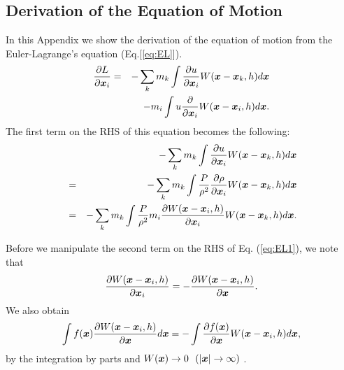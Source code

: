 \documentclass{cjour}
\newcommand{ \Vec   }[1]{ \mbox{\boldmath $ #1 $} }
\newcommand{ \PD    }[2]{ \frac{ \partial #1 }{ \partial #2 } }
\begin{document}
\begin{article}
\appendix{}

\section{Derivation of the Equation of Motion}


In this Appendix we show the derivation of the equation of motion 
from the Euler-Lagrange's equation (Eq.[\ref{eq:EL}]). 
 \begin{eqnarray}
       \PD{L}{\Vec{x}_i} 
       & = &  - \sum_{k} m_k 
                         \int \PD{u}{\Vec{x}_i} 
                         W(\Vec{x}-\Vec{x}_k, h) d\Vec{x} \nonumber \\
       &   &  -          m_i 
                         \int u \PD{}{\Vec{x}_i} 
                         W(\Vec{x}-\Vec{x}_i, h) d\Vec{x} .
                                                     \label{eq:EL1}
 \end{eqnarray}
The first term on the RHS of this equation becomes the following:
 \begin{eqnarray}
       &   &  - \sum_{k} m_k 
                         \int \PD{u}{\Vec{x}_i} 
                         W(\Vec{x}-\Vec{x}_k, h) d\Vec{x} \nonumber \\
       & = &  - \sum_{k} m_k 
                         \int \frac{ P }{ \rho^2 }
                         \PD{ \rho }{ \Vec{x}_i }
                         W( \Vec{x}-\Vec{x}_k, h ) d\Vec{x} \nonumber \\
       & = &  - \sum_{k} m_k 
                         \int \frac{ P }{ \rho^2 }
                         m_i 
                         \PD{ W( \Vec{x}-\Vec{x}_i, h ) }{ \Vec{x}_i }
                         W( \Vec{x}-\Vec{x}_k, h ) d\Vec{x} .
 \end{eqnarray}

Before we manipulate the second term on the RHS of Eq. (\ref{eq:EL1}), 
we note that 
 \begin{equation}
              \PD{ W( \Vec{x}-\Vec{x}_i, h ) }{ \Vec{x}_i } 
         =  - \PD{ W( \Vec{x}-\Vec{x}_i, h ) }{ \Vec{x}   } .
 \end{equation}
We also obtain   
 \begin{equation}
              \int f(\Vec{x}) 
                   \PD{ W( \Vec{x}-\Vec{x}_i, h ) }{ \Vec{x} } 
                   d\Vec{x}
         =  - \int \PD{ f(\Vec{x}) }{ \Vec{x} } 
                   W( \Vec{x}-\Vec{x}_i, h ) 
                   d\Vec{x} ,
 \end{equation}
by the integration by parts and 
$W(\Vec{x}) \rightarrow 0 ~~(|\Vec{x}| \rightarrow \infty)$ . 


\end{article}
\end{document}
